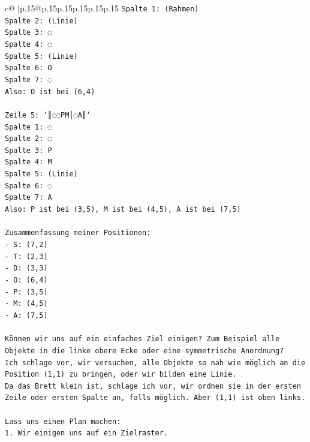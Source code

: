 \documentclass{article}
\begin{document}
{\begin{supertabular}{c@{$\;$}|p{.15\linewidth}@{}p{.15\linewidth}p{.15\linewidth}p{.15\linewidth}p{.15\linewidth}p{.15\linewidth}}
{{{\texttt{Spalte 1: (Rahmen)} \\
\texttt{Spalte 2: (Linie)} \\
\texttt{Spalte 3: ◌} \\
\texttt{Spalte 4: ◌} \\
\texttt{Spalte 5: (Linie)} \\
\texttt{Spalte 6: O} \\
\texttt{Spalte 7: ◌} \\
\texttt{Also: O ist bei (6,4)} \\
\\ 
\texttt{Zeile 5: `║◌◌PM│◌A║`} \\
\texttt{Spalte 1: ◌} \\
\texttt{Spalte 2: ◌} \\
\texttt{Spalte 3: P} \\
\texttt{Spalte 4: M} \\
\texttt{Spalte 5: (Linie)} \\
\texttt{Spalte 6: ◌} \\
\texttt{Spalte 7: A} \\
\texttt{Also: P ist bei (3,5), M ist bei (4,5), A ist bei (7,5)} \\
\\ 
\texttt{Zusammenfassung meiner Positionen:} \\
\texttt{{-} S: (7,2)} \\
\texttt{{-} T: (2,3)} \\
\texttt{{-} D: (3,3)} \\
\texttt{{-} O: (6,4)} \\
\texttt{{-} P: (3,5)} \\
\texttt{{-} M: (4,5)} \\
\texttt{{-} A: (7,5)} \\
\\ 
\texttt{Können wir uns auf ein einfaches Ziel einigen? Zum Beispiel alle Objekte in die linke obere Ecke oder eine symmetrische Anordnung?} \\
\texttt{Ich schlage vor, wir versuchen, alle Objekte so nah wie möglich an die Position (1,1) zu bringen, oder wir bilden eine Linie.} \\
\texttt{Da das Brett klein ist, schlage ich vor, wir ordnen sie in der ersten Zeile oder ersten Spalte an, falls möglich. Aber (1,1) ist oben links.} \\
\\ 
\texttt{Lass uns einen Plan machen:} \\
\texttt{1. Wir einigen uns auf ein Zielraster.} \\
}}}
\end{supertabular}}
\end{document}

